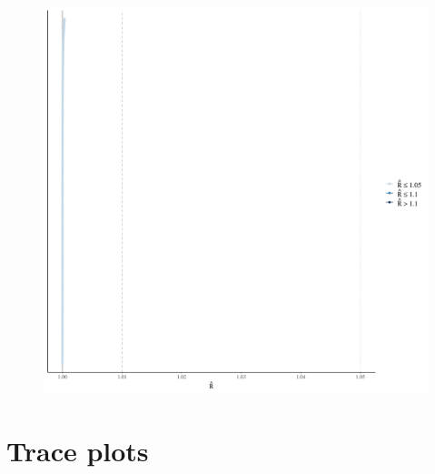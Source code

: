 \documentclass[
]{report}
\begin{document}
\begin{figure}

{\centering \includegraphics[width=1\textwidth,height=\textheight]{diagnostic_plots_files/figure-pdf/unnamed-chunk-22-1.pdf}

}

\end{figure}

\hypertarget{trace-plots-7}{%
\section{Trace plots}\label{trace-plots-7}}
\end{document}
